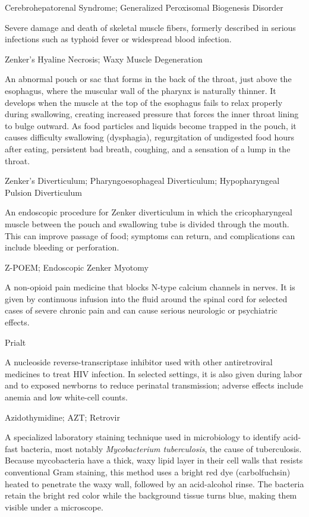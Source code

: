 \synonyms
Cerebrohepatorenal Syndrome; Generalized Peroxisomal Biogenesis Disorder

 Severe damage and death of skeletal muscle fibers, formerly described in serious infections such as typhoid fever or widespread blood infection.

\synonyms
Zenker's Hyaline Necrosis; Waxy Muscle Degeneration

 An abnormal pouch or sac that forms in the back of the throat, just above the esophagus, where the muscular wall of the pharynx is naturally thinner. It develops when the muscle at the top of the esophagus fails to relax properly during swallowing, creating increased pressure that forces the inner throat lining to bulge outward. As food particles and liquids become trapped in the pouch, it causes difficulty swallowing (dysphagia), regurgitation of undigested food hours after eating, persistent bad breath, coughing, and a sensation of a lump in the throat.

\synonyms
Zenker's Diverticulum; Pharyngoesophageal Diverticulum; Hypopharyngeal Pulsion Diverticulum

 An endoscopic procedure for Zenker diverticulum in which the cricopharyngeal muscle between the pouch and swallowing tube is divided through the mouth. This can improve passage of food; symptoms can return, and complications can include bleeding or perforation.

\synonyms
Z-POEM; Endoscopic Zenker Myotomy

 A non-opioid pain medicine that blocks N-type calcium channels in nerves. It is given by continuous infusion into the fluid around the spinal cord for selected cases of severe chronic pain and can cause serious neurologic or psychiatric effects.

\synonyms
Prialt

 A nucleoside reverse-transcriptase inhibitor used with other antiretroviral medicines to treat HIV infection. In selected settings, it is also given during labor and to exposed newborns to reduce perinatal transmission; adverse effects include anemia and low white-cell counts.

\synonyms
Azidothymidine; AZT; Retrovir

 A specialized laboratory staining technique used in microbiology to identify acid-fast bacteria, most notably \textit{Mycobacterium tuberculosis}, the cause of tuberculosis. Because mycobacteria have a thick, waxy lipid layer in their cell walls that resists conventional Gram staining, this method uses a bright red dye (carbolfuchsin) heated to penetrate the waxy wall, followed by an acid-alcohol rinse. The bacteria retain the bright red color while the background tissue turns blue, making them visible under a microscope.

